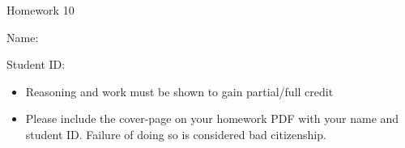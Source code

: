 \documentclass[11pt]{exam}
\begin{document}
\centerline{\Large \sc Homework 10}
\pagestyle{empty}

\hrulefill

\vspace{2cm}


{\Large \sc Name:}



\vspace{2cm}



{\Large \sc Student ID:}

\vspace{6cm}

\begin{itemize}
  \item Reasoning and work must be shown to gain partial/full
  credit
  \item Please include the cover-page on your homework PDF with your name and student ID. Failure of doing so is considered bad citizenship. 

 \end{itemize}

\clearpage
\end{document}

